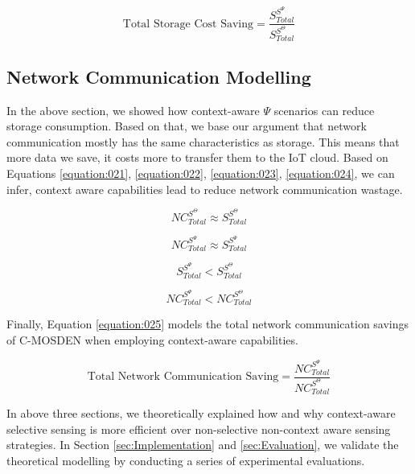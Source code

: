 \documentclass[journal]{IEEEtran}
\begin{document}
\begin{equation}
\label{equation:020}
\textrm{Total Storage Cost Saving}  = \frac{S_{Total}^{S^{\Psi}}}{S_{Total}^{S^{\Theta}}} 
\end{equation}



\subsection{Network Communication Modelling}
\label{sec:Network_Communication}

In the above section, we showed how context-aware $\Psi$ scenarios can reduce storage consumption. Based on that, we base our argument that network communication mostly has the same characteristics as storage. This means that more data we save, it costs more to transfer them to the IoT cloud. Based on Equations \ref{equation:021}, \ref{equation:022}, \ref{equation:023}, \ref{equation:024}, we can infer, context aware capabilities lead to reduce network communication wastage. 


\begin{equation}
\label{equation:021}
NC_{Total}^{S^{\Theta}}   \approx S_{Total}^{S^{\Theta}}
\end{equation}


\begin{equation}
\label{equation:022}
NC_{Total}^{S^{\Psi}}  \approx S_{Total}^{S^{\Psi}}
\end{equation}



\begin{equation}
\label{equation:023}
S_{Total}^{S^{\Psi}}  < S_{Total}^{S^{\Theta}}
\end{equation}




\begin{equation}
\label{equation:024}
NC_{Total}^{S^{\Psi}} < NC_{Total}^{S^{\Theta}} 
\end{equation}


Finally, Equation \ref{equation:025} models the total network communication savings of C-MOSDEN when employing context-aware capabilities. 

\begin{equation}
\label{equation:025}
\textrm{Total Network Communication Saving}  = \frac{NC_{Total}^{S^{\Psi}}}{NC_{Total}^{S^{\Theta}} } 
\end{equation}


In above three sections, we theoretically explained how and why context-aware selective sensing is more efficient over non-selective non-context aware sensing strategies. In Section \ref{sec:Implementation} and \ref{sec:Evaluation}, we validate the theoretical modelling by conducting a series of experimental evaluations.
\end{document}
